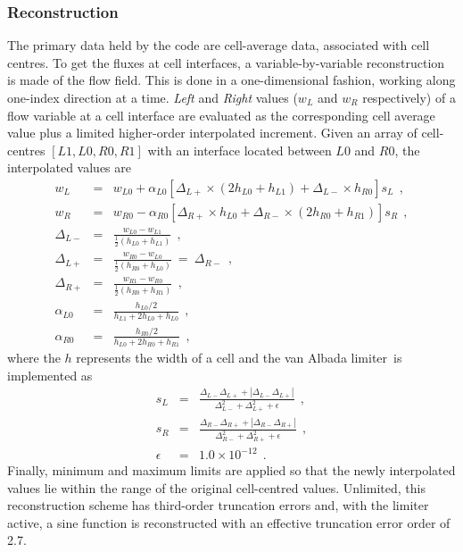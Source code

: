 \subsubsection{Reconstruction}
%
The primary data held by the code are cell-average data, associated with cell centres.
To get the fluxes at cell interfaces, a variable-by-variable reconstruction is made of the flow field.
This is done in a one-dimensional fashion, working along one-index direction at a time.
\textit{Left} and \textit{Right} values ($w_L$ and $w_R$ respectively) of a flow variable at a cell interface
are evaluated as the corresponding cell average value plus a limited higher-order interpolated increment.
Given an array of cell-centres $[L1,L0,R0,R1]$ with an interface located between $L0$ and $R0$, the interpolated
values are
\begin{eqnarray}
  w_L & = & w_{L0} + \alpha_{L0} \left[ \Delta_{L+} \times \left( 2 h_{L0} + h_{L1} \right) + \Delta_{L-} \times h_{R0} \right] s_L ~~, \nonumber \\
  w_R & = & w_{R0} - \alpha_{R0} \left[ \Delta_{R+} \times h_{L0} + \Delta_{R-} \times \left( 2 h_{R0} + h_{R1} \right) \right] s_R ~~, \nonumber \\
  \Delta_{L-} & = & \frac{w_{L0} - w_{L1}}{\frac{1}{2} \left( h_{L0} + h_{L1}\right)} ~~, \nonumber \\
  \Delta_{L+} & = & \frac{w_{R0} - w_{L0}}{\frac{1}{2} \left( h_{R0} + h_{L0} \right)} ~ = ~ \Delta_{R-} ~~, \nonumber \\
  \Delta_{R+} & = & \frac{w_{R1} - w_{R0}}{\frac{1}{2} \left( h_{R0} + h_{R1} \right)} ~~, \nonumber \\
  \alpha_{L0}  & = & \frac{h_{L0} / 2}{h_{L1} + 2 h_{L0} + h_{L0}} ~~, \nonumber \\
  \alpha_{R0}  & = & \frac{h_{R0} / 2}{h_{L0} + 2 h_{R0} + h_{R1}} ~~,
\end{eqnarray}
where the $h$ represents the width of a cell and the van Albada limiter\,\cite{vanalbada_etal_81} is implemented as
\begin{eqnarray}
 s_L & = & \frac{\Delta_{L-} \Delta_{L+} + |\Delta_{L-} \Delta_{L+}|}{\Delta_{L-}^2 + \Delta_{L+}^2 + \epsilon} ~~, \nonumber \\
 s_R & = & \frac{\Delta_{R-} \Delta_{R+} + |\Delta_{R-} \Delta_{R+}|}{\Delta_{R-}^2 + \Delta_{R+}^2 + \epsilon} ~~, \nonumber \\
 \epsilon & = & 1.0 \times 10^{-12} ~~. \nonumber
\end{eqnarray}
Finally, minimum and maximum limits are applied so that the newly interpolated values 
lie within the range of the original cell-centred values. 
Unlimited, this reconstruction scheme has third-order truncation errors and, with the limiter active, a sine function
is reconstructed with an effective truncation error order of 2.7.
 
